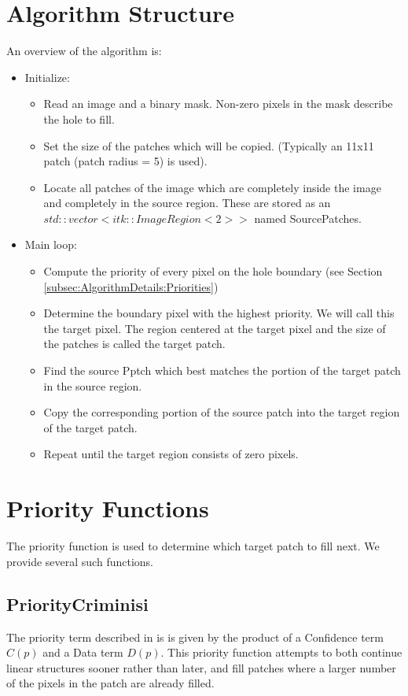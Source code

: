 \documentclass{InsightArticle}
\begin{document}
\section{Algorithm Structure}
An overview of the algorithm is:
\begin{itemize}
  \item Initialize:
    \begin{itemize}
      \item Read an image and a binary mask. Non-zero pixels in the mask describe the hole to fill.
      \item Set the size of the patches which will be copied. (Typically an 11x11 patch (patch radius = 5) is used).
      \item Locate all patches of the image which are completely inside the image and completely in the source region. These are stored as an $std::vector<itk::ImageRegion<2> >$ named SourcePatches.
    \end{itemize}

  \item Main loop:
  \begin{itemize}
    \item Compute the priority of every pixel on the hole boundary (see Section \ref{subsec:AlgorithmDetails:Priorities})
    \item Determine the boundary pixel with the highest priority. We will call this the target pixel. The region centered at the target pixel and the size of the patches is called the target patch.
    \item Find the source Pptch which best matches the portion of the target patch in the source region.
    \item Copy the corresponding portion of the source patch into the target region of the target patch.
    \item Repeat until the target region consists of zero pixels.
  \end{itemize}
\end{itemize}

\section{Priority Functions}
\label{sec:PriorityFunctions}
The priority function is used to determine which target patch to fill next. We provide several such functions.

\subsection{PriorityCriminisi}
The priority term described in \cite{criminisi} is is given by the product of a Confidence term $C(p)$ and a Data term $D(p)$. This priority function attempts to both continue linear structures sooner rather than later, and fill patches where a larger number of the pixels in the patch are already filled.
\end{document}
